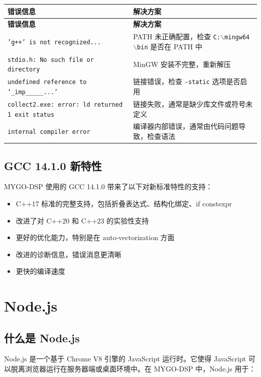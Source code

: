 ﻿\documentclass[12pt,a4paper,oneside]{ctexbook}
\begin{document}
\begin{longtable}{p{4cm}p{9cm}}
    \toprule
    \textbf{错误信息} & \textbf{解决方案} \\
    \midrule
    \endfirsthead
    \toprule
    \textbf{错误信息} & \textbf{解决方案} \\
    \midrule
    \endhead
    \bottomrule
    \endfoot
    \texttt{'g++' is not recognized...} & PATH 未正确配置，检查 \texttt{C:$\backslash$mingw64$\backslash$bin} 是否在 PATH 中 \\
    \texttt{stdio.h: No such file or directory} & MinGW 安装不完整，重新解压 \\
    \texttt{undefined reference to `\_imp\_\_\_\_\_...'} & 链接错误，检查 \texttt{-static} 选项是否启用 \\
    \texttt{collect2.exe: error: ld returned 1 exit status} & 链接失败，通常是缺少库文件或符号未定义 \\
    \texttt{internal compiler error} & 编译器内部错误，通常由代码问题导致，检查语法 \\
    \bottomrule
\end{longtable}

\subsection{GCC 14.1.0 新特性}

MYGO-DSP 使用的 GCC 14.1.0 带来了以下对新标准特性的支持：

\begin{itemize}
    \item C++17 标准的完整支持，包括折叠表达式、结构化绑定、if constexpr
    \item 改进了对 C++20 和 C++23 的实验性支持
    \item 更好的优化能力，特别是在 auto-vectorization 方面
    \item 改进的诊断信息，错误消息更清晰
    \item 更快的编译速度
\end{itemize}

\section{Node.js}

\subsection{什么是 Node.js}

Node.js 是一个基于 Chrome V8 引擎的 JavaScript 运行时。它使得 JavaScript 可以脱离浏览器运行在服务器端或桌面环境中。在 MYGO-DSP 中，Node.js 用于：
\end{document}

